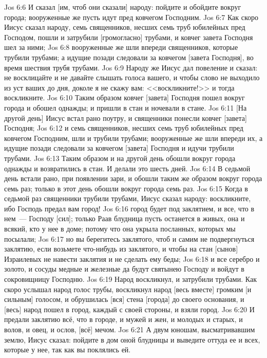 \vs Jos 6:6 И сказал [им, чтоб они сказали] народу: пойдите и обойдите вокруг города; вооруженные же пусть идут пред ковчегом Господним.
\vs Jos 6:7 Как скоро Иисус сказал народу, семь священников, несших семь труб юбилейных пред Господом, пошли и затрубили [громогласно] трубами, и ковчег завета Господня шел за ними;
\vs Jos 6:8 вооруженные же шли впереди священников, которые трубили трубами; а идущие позади следовали за ковчегом [завета Господня], во время шествия трубя трубами.
\vs Jos 6:9 Народу же Иисус дал повеление и сказал: не восклицайте и не давайте слышать голоса вашего, и чтобы слово не выходило из уст ваших до  дня, доколе я не скажу вам: <<воскликните!>> и тогда воскликните.
\vs Jos 6:10 Таким образом ковчег [завета] Господня пошел вокруг города и обошел однажды; и пришли в стан и ночевали в стане.
\vs Jos 6:11 [На другой день] Иисус встал рано поутру, и священники понесли ковчег [завета] Господня;
\vs Jos 6:12 и семь священников, несших семь труб юбилейных пред ковчегом Господним, шли и трубили трубами; вооруженные же шли впереди их, а идущие позади следовали за ковчегом [завета] Господня и идучи трубили трубами.
\vs Jos 6:13 Таким образом и на другой день обошли вокруг города однажды и возвратились в стан. И делали это шесть дней.
\vs Jos 6:14 В седьмой день встали рано, при появлении зари, и обошли таким же образом вокруг города семь раз; только в этот день обошли вокруг города семь раз.
\vs Jos 6:15 Когда в седьмой раз священники трубили трубами, Иисус сказал народу: воскликните, ибо Господь предал вам город!
\vs Jos 6:16 город будет под заклятием, и все, что в нем~--- Господу [сил]; только Раав блудница пусть останется в живых, она и всякий, кто у нее в доме; потому что она укрыла посланных, которых мы посылали;
\vs Jos 6:17 но вы берегитесь заклятого, чтоб и самим не подвергнуться заклятию, если возьмете что-нибудь из заклятого, и чтобы на стан [сынов] Израилевых не навести заклятия и не сделать ему беды;
\vs Jos 6:18 и все серебро и золото, и сосуды медные и железные да будут святынею Господу и войдут в сокровищницу Господню.
\vs Jos 6:19 Народ воскликнул, и затрубили трубами. Как скоро услышал народ голос трубы, воскликнул народ [весь вместе] громким [и сильным] голосом, и обрушилась [вся] стена [города] до своего основания, и [весь] народ пошел в город, каждый с своей стороны, и взяли город.
\vs Jos 6:20 И предали заклятию всё, что в городе, и мужей и жен, и молодых и старых, и волов, и овец, и ослов, [всё]  мечом.
\vs Jos 6:21 А двум юношам, высматривавшим землю, Иисус сказал: пойдите в дом оной блудницы и выведите оттуда ее и всех, которые у нее, так как вы поклялись ей.
